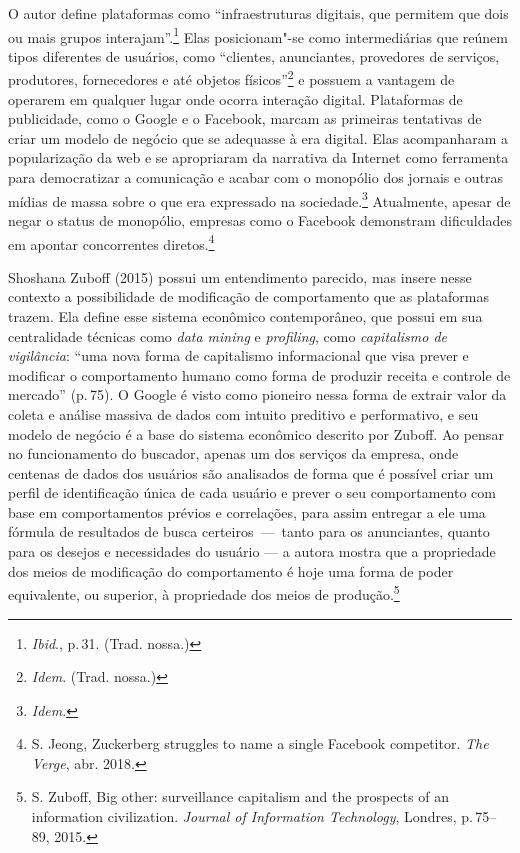 O autor define plataformas como ``infraestruturas digitais, que permitem
que dois ou mais grupos interajam''.\footnote{\textit{Ibid}., p.\,31. (Trad.
nossa.)} Elas posicionam"-se como intermediárias que reúnem tipos
diferentes de usuários, como ``clientes, anunciantes, provedores de
serviços, produtores, fornecedores e até objetos físicos''\footnote{\textit{Idem}. (Trad. nossa.)} e possuem a vantagem
de operarem em qualquer lugar onde ocorra interação digital. Plataformas
de publicidade, como o Google e o Facebook, marcam as primeiras
tentativas de criar um modelo de negócio que se adequasse à era digital.
Elas acompanharam a popularização da web e se apropriaram da narrativa
da Internet como ferramenta para democratizar a comunicação e acabar com
o monopólio dos jornais e outras mídias de massa sobre o que era
expressado na sociedade.\footnote{\textit{Idem}.} Atualmente, apesar de negar o
status de monopólio, empresas como o Facebook demonstram dificuldades em
apontar concorrentes diretos.\footnote{S. Jeong, Zuckerberg struggles to name a single Facebook competitor. \textit{The Verge}, abr. 2018.}

Shoshana Zuboff (2015) possui um entendimento parecido, mas insere nesse
contexto a possibilidade de modificação de comportamento que as
plataformas trazem. Ela define esse sistema econômico contemporâneo, que
possui em sua centralidade técnicas como \textit{data mining} e
\textit{profiling}, como \textit{capitalismo de vigilância}: ``uma nova forma de
capitalismo informacional que visa prever e modificar o comportamento
humano como forma de produzir receita e controle de mercado'' (p.\,75). O
Google é visto como pioneiro nessa forma de extrair valor da coleta e
análise massiva de dados com intuito preditivo e performativo, e seu
modelo de negócio é a base do sistema econômico descrito por Zuboff. Ao
pensar no funcionamento do buscador, apenas um dos serviços da empresa,
onde centenas de dados dos usuários são analisados de forma que é
possível criar um perfil de identificação única de cada usuário e prever
o seu comportamento com base em comportamentos prévios e correlações,
para assim entregar a ele uma fórmula de resultados de busca certeiros~---~tanto para os anunciantes, quanto para os desejos e necessidades do
usuário --- a autora mostra que a propriedade dos meios de modificação do
comportamento é hoje uma forma de poder equivalente, ou superior, à
propriedade dos meios de produção.\footnote{S. Zuboff, Big other: surveillance capitalism and the prospects of an information civilization. \textit{Journal of
Information Technology}, Londres, p.\,75--89, 2015.}

